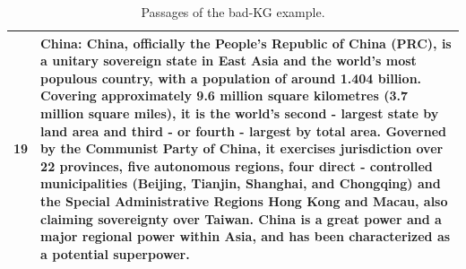 \begin{table}[t]
\begin{tabularx}{\textwidth}{c X}
19 & \textbf{China}: China, officially the People's Republic of China (PRC), is a unitary sovereign state in East Asia and the world's most populous country, with a population of around 1.404 billion. Covering approximately 9.6 million square kilometres (3.7 million square miles), it is the world's second - largest state by land area and third - or fourth - largest by total area. Governed by the Communist Party of China, it exercises jurisdiction over 22 provinces, five autonomous regions, four direct - controlled municipalities (Beijing, Tianjin, Shanghai, and Chongqing) and the Special Administrative Regions Hong Kong and Macau, also claiming sovereignty over Taiwan. China is a great power and a major regional power within Asia, and has been characterized as a potential superpower. \\
\bottomrule
\end{tabularx}
\caption{Passages of the bad-KG example.}
\label{tab:bad_example_text}
\end{table}
